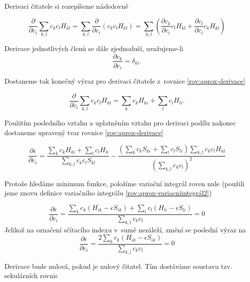  \noindent Derivaci čitatele si rozepíšeme následovně
 
 \begin{equation}
 \frac{\partial}{\partial c_i} \sum_{k,l}c_k c_l H_{kl}=\sum_{k,l} \frac{\partial}{\partial c_i} (c_k c_l H_{kl})=\sum_{k,l} \left(\frac{\partial c_k}{\partial c_i}c_l H_{kl} + \frac{\partial c_l}{\partial c_i}c_k H_{kl} \right)
   \end{equation}
 
\noindent  Derivace jednotlivých členů se dále zjednoduší, uvažujeme-li
  \begin{equation}
 \frac{\partial c_k}{\partial c_i}=\delta_{ki}.
   \end{equation}
 
 \noindent Dostaneme tak konečný výraz pro derivaci čitatele z~rovnice \ref{rov:aprox-derivace}
 
  \begin{equation}
 \frac{\partial}{\partial c_i} \sum_{k,l}c_k c_l H_{kl}=\sum_{k} c_k H_{ki}+\sum_{l} c_l H_{li}.
   \end{equation}
 
 \noindent Použitím posledního vztahu a uplatněním vztahu pro derivaci podílu nakonec dostaneme upravený tvar rovnice \ref{rov:aprox-derivace}
 
  \begin{equation}
 \frac{\partial\epsilon}{\partial c_i}=\frac{\sum_{k} c_k H_{ki}+\sum_{l} c_l H_{li}}{\sum_{k,l}c_kc_lS_{kl}}-\frac{\left(\sum_{k} c_k S_{ki}+\sum_{l} c_l S_{li}\right)\sum_{k,l}c_k c_l H_{kl}}{\left(\sum_{k,l}c_k c_l\right)^2}
   \end{equation}
 
 \noindent Protože hledáme minimum funkce, položíme variační integrál roven nule (použili jsme znovu definice variačního integrálu \ref{rov:aprox-variacniintegrál2})
 
  \begin{equation}
 \frac{\partial\epsilon}{\partial c_i}=\frac{\sum_k c_{k}\left(H_{ik}-\epsilon S_{ik}\right)+\sum_l c_{l}\left(H_{li}-\epsilon S_{li}\right)}{\sum_{k,l}c_k c_l}=0
     \end{equation}
 Jelikož na označení sčítacího indexu v~sumě nezáleží, změní se poslední výraz na 
\begin{equation} 
 \frac{\partial\epsilon}{\partial c_i}=\frac{2\sum_k c_{k}\left(H_{ik}-\epsilon S_{ik}\right)}{\sum_{k,l}c_k c_l}=0
\end{equation}
 
\noindent Derivace bude nulová, pokud je nulový čitatel. Tím dostáváme soustavu tzv. sekulárních rovnic

